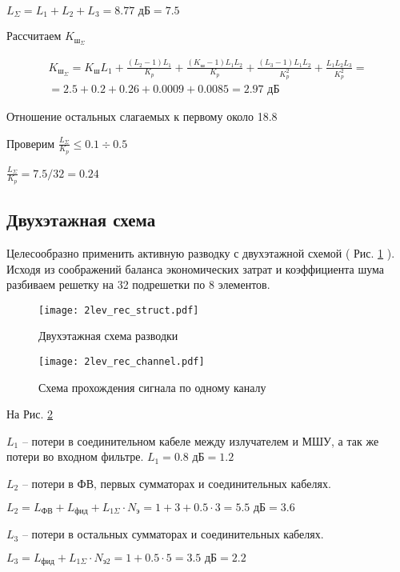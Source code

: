 $L_\Sigma=L_1+L_2+L_3=8.77 \text{ дБ}=7.5$

Рассчитаем $K_{\text{ш}_\Sigma}$

\begin{multline*} \displaystyle K_{\text{ш}_\Sigma}=K_\text{ш}L_1+\frac{(L_2-1)L_1}{K_p}+\frac{(K_\text{ш}-1)L_1L_2}{K_p}+\frac{(L_3-1)L_1L_2}{K^2_p}+\frac{L_1L_2L_3}{K^2_p}=\\=2.5+0.2+0.26+0.0009+0.0085=2.97 \text{ дБ}\end{multline*}

Отношение остальных слагаемых к первому около 18.8%

Проверим $\displaystyle \frac{L_\Sigma}{K_p}\leq 0.1\div0.5$

 $\displaystyle \frac{L_\Sigma}{K_p}=7.5/32=0.24$
 
 \subsection{Двухэтажная схема}
 Целесообразно применить активную разводку с двухэтажной схемой ( Рис. \ref{fig:2lev_rec_struct} ). Исходя из соображений баланса экономических затрат и коэффициента шума разбиваем решетку на 32 подрешетки по 8 элементов.
 
 \begin{figure}[H]
 	\centering
 	\texttt{[image: 2lev\_rec\_struct.pdf]}
 	\caption{Двухэтажная схема разводки}
 	\label{fig:2lev_rec_struct}
 \end{figure}

\begin{figure}[H]
	\centering
	\texttt{[image: 2lev\_rec\_channel.pdf]}
	\caption{Схема прохождения сигнала по одному каналу}
	\label{fig:2lev_rec_channel}
\end{figure}

На Рис. \ref{fig:2lev_rec_channel} 

$L_1$ -- потери в соединительном кабеле между излучателем и МШУ, а так же потери во входном фильтре. $L_1=0.8\text{ дБ}=1.2$

$L_2$ -- потери в ФВ, первых сумматорах и соединительных кабелях.

$L_2=L_\text{ФВ}+L_\text{фид}+L_{1\Sigma}\cdot N_\text{э}=1+3+0.5\cdot3=5.5\text{ дБ}=3.6$

$L_3$ -- потери в остальных сумматорах и соединительных кабелях.

$L_3=L_\text{фид}+L_{1\Sigma}\cdot N_\text{э2}=1+0.5\cdot5=3.5 \text{ дБ}=2.2$

